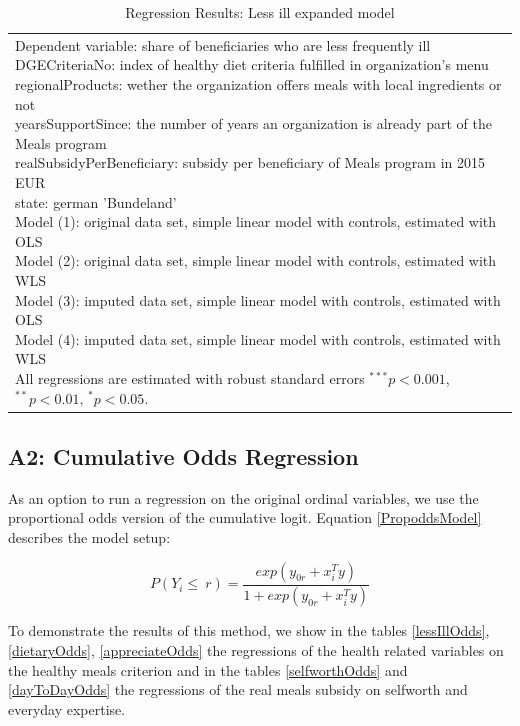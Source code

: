 \documentclass[12pt, a4paper, titlepage]{article}\usepackage[]{graphicx}\usepackage[]{color}
\begin{document}
\begin{table}
\begin{center}
{\begin{tabular}{l c c c c }
\hline
\multicolumn{5}{l}{\scriptsize{\parbox{\linewidth}
{\vspace{2pt} Dependent variable: share of beneficiaries who are less frequently ill \\ DGECriteriaNo: index of healthy diet criteria fulfilled in organization's menu \\ regionalProducts: wether the organization offers meals with local ingredients or not \\ yearsSupportSince: the number of years an organization is already part of the Meals program \\ realSubsidyPerBeneficiary: subsidy per beneficiary of Meals program in 2015 EUR \\ state: german 'Bundeland' \\ Model (1): original data set, simple linear model with controls, estimated with OLS \\ Model (2): original data set, simple linear model with controls, estimated with WLS \\ Model (3): imputed data set, simple linear model with controls, estimated with OLS \\ Model (4): imputed data set, simple linear model with controls, estimated with WLS \\ All regressions are estimated with robust standard errors $^{***}p<0.001$, $^{**}p<0.01$, $^*p<0.05$.}}}
\end{tabular}
}
\caption{Regression Results: Less ill expanded model}
\label{expandLessIll}
\end{center}
\end{table}


\subsection{A2: Cumulative Odds Regression} 

As an option to run a regression on the original ordinal variables, we use the proportional odds version of the cumulative logit. Equation \ref{PropoddsModel} describes the model setup: 

 
\begin{equation}
\label{PropoddsModel}
  P(Y_i \leq \ r) = \frac{exp(y_{0r} + x_i^Ty)}{1+exp(y_{0r} + x_i^Ty)}    
\end{equation}


To demonstrate the results of this method, we show in the tables \ref{lessIllOdds}, \ref{dietaryOdds}, \ref{appreciateOdds} the regressions of the health related variables on the healthy meals criterion and in the tables \ref{selfworthOdds} and \ref{dayToDayOdds} the regressions of the real meals subsidy on selfworth and everyday expertise. 
\end{document}
